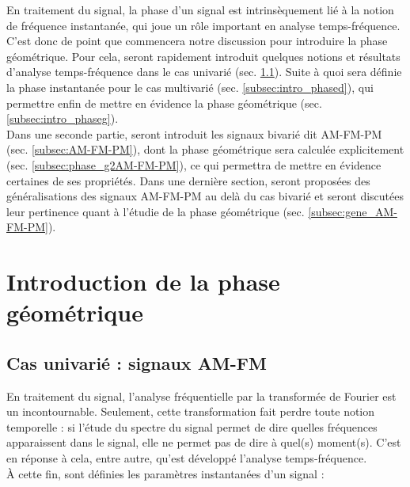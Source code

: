 
En traitement du signal, la phase d'un signal est intrinsèquement lié à la notion de fréquence instantanée, qui joue un rôle important en analyse temps-fréquence. 
C'est donc de point que commencera notre discussion pour introduire la phase géométrique.
Pour cela, seront rapidement introduit quelques notions et résultats d'analyse temps-fréquence dans le cas univarié (sec. \ref{subsec:ana_temp-freq}). Suite à quoi sera définie la phase instantanée pour le cas multivarié (sec. \ref{subsec:intro_phased}), qui permettre enfin de mettre en évidence la phase géométrique (sec. \ref{subsec:intro_phaseg}).
\\

 Dans une seconde partie, seront introduit les signaux bivarié dit AM-FM-PM  (sec. \ref{subsec:AM-FM-PM}), dont la phase géométrique sera calculée explicitement (sec. \ref{subsec:phase_g2AM-FM-PM}), ce qui permettra de mettre en évidence certaines de ses propriétés. Dans une dernière section, seront proposées des généralisations des signaux AM-FM-PM au delà du cas bivarié et seront discutées leur pertinence quant à l'étudie de la phase géométrique (sec. \ref{subsec:gene_AM-FM-PM}). 

\section{Introduction de la phase géométrique} \label{sec:intro_phaseg}




\subsection{Cas univarié : signaux AM-FM} \label{subsec:ana_temp-freq}


En traitement du signal, l'analyse fréquentielle par la transformée de Fourier est un incontournable. 
Seulement, cette transformation fait perdre toute notion temporelle : si l'étude du spectre du signal permet de dire quelles fréquences apparaissent dans le signal, elle ne permet pas de dire à quel(s) moment(s). 
C'est en réponse à cela, entre autre, qu'est développé l'analyse temps-fréquence. 
\\
À cette fin, sont définies les paramètres instantanées d'un signal :\par

